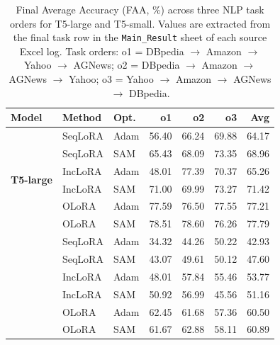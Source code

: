 
\begin{table}[ht]
\centering
\caption{%
  Final Average Accuracy (FAA, \%) across three NLP task orders for T5-large and T5-small.
  Values are extracted from the final task row in the \texttt{Main\_Result} sheet of each source Excel log.
  Task orders: o1 = DBpedia $\rightarrow$ Amazon $\rightarrow$ Yahoo $\rightarrow$ AGNews;
  o2 = DBpedia $\rightarrow$ Amazon $\rightarrow$ AGNews $\rightarrow$ Yahoo;
  o3 = Yahoo $\rightarrow$ Amazon $\rightarrow$ AGNews $\rightarrow$ DBpedia.
}
\label{tab:combine_llm_detailed}
\setlength{\tabcolsep}{4.5pt}
\renewcommand{\arraystretch}{0.95}
\small
\begin{tabular}{@{}l l l r r r r@{}}
\toprule
\textbf{Model} & \textbf{Method} & \textbf{Opt.} & \textbf{o1} & \textbf{o2} & \textbf{o3} & \textbf{Avg} \\
\midrule
\multirow{6}{*}{\textbf{T5-large}} & SeqLoRA & Adam & 56.40 & 66.24 & 69.88 & 64.17 \\
 & SeqLoRA & SAM & 65.43 & 68.09 & 73.35 & 68.96 \\
\addlinespace[2pt]
 & IncLoRA & Adam & 48.01 & 77.39 & 70.37 & 65.26 \\
 & IncLoRA & SAM & 71.00 & 69.99 & 73.27 & 71.42 \\
\addlinespace[2pt]
 & OLoRA & Adam & 77.59 & 76.50 & 77.55 & 77.21 \\
 & OLoRA & SAM & 78.51 & 78.60 & 76.26 & 77.79 \\
\addlinespace[2pt]
\multirow{6}{*}{\textbf{T5-small}} & SeqLoRA & Adam & 34.32 & 44.26 & 50.22 & 42.93 \\
 & SeqLoRA & SAM & 43.07 & 49.61 & 50.12 & 47.60 \\
\addlinespace[2pt]
 & IncLoRA & Adam & 48.01 & 57.84 & 55.46 & 53.77 \\
 & IncLoRA & SAM & 50.92 & 56.99 & 45.56 & 51.16 \\
\addlinespace[2pt]
 & OLoRA & Adam & 62.45 & 61.68 & 57.36 & 60.50 \\
 & OLoRA & SAM & 61.67 & 62.88 & 58.11 & 60.89 \\
\bottomrule
\end{tabular}
\end{table}

